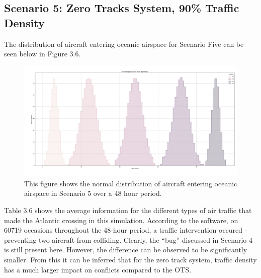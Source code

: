\documentclass[stu, a4paper, 12pt, floatsintext]{apa7}
\numberwithin{figure}{section}
\numberwithin{table}{section}
\numberwithin{equation}{section}
\begin{document}
\subsection{Scenario 5: Zero Tracks System, 90\% Traffic Density}
The distribution of aircraft entering oceanic airspace for Scenario Five can be seen below in Figure 3.6.

\begin{figure}[H]
    \caption{This figure shows the normal distribution of aircraft entering oceanic airspace in Scenario 5 over a 48 hour period.}
    \label{fig:3.6}
    \centering
    \includegraphics[width=1.1\textwidth]{pictures/Figure 3.6.png}    
\end{figure}

Table 3.6 shows the average information for the different types of air traffic that made the Atlantic crossing in this simulation. According to the software, on 60719 occasions throughout the 48-hour period, a traffic intervention occured - preventing two aircraft from colliding. Clearly, the “bug” discussed in Scenario 4 is still present here. However, the difference can be observed to be significantly smaller. From this it can be inferred that for the zero track system, traffic density has a much larger impact on conflicts compared to the OTS. 
\end{document}
